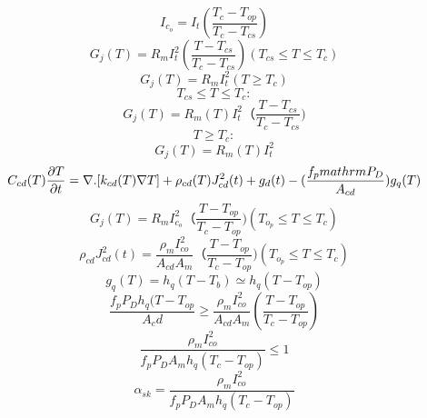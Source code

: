 \begin{equation}%
I_{c_o}=I_t(\frac{T_c-T_{op} }{T_c-T_{cs}})
\end{equation}
\begin{equation}%
G_j(T)=R_mI_t^2(\frac{T-T_{cs}}{T_c-T_{cs}}) (T_{cs}\leq T\leq T_c)
\end{equation}
\begin{equation}%
G_j(T)=R_mI_t^2 (T\ge T_c)
\end{equation}
\begin{equation}%
T_{cs}\leq T\leq T_c:
\end{equation}
\begin{equation}%
G_j(T)=R_m(T)I_t^2（\frac{T-T_{cs}}{T_c-T_{cs}})
\end{equation}
\begin{equation}%
T\ge T_c:
\end{equation}
\begin{equation}%
G_j(T)=R_m(T)I_t^2
\end{equation}
\begin{equation}%
C_{cd}(T)\frac {\partial T}{\partial t}=\nabla.[k_{cd}(T)\nabla T]+\rho _{cd}(T)J_{cd}^2(t)+g_d(t)-(\frac{f_p\ \\mathrm{P}_D}{A_{cd}})g_q(T)
\end{equation}
\begin{equation}%
G_j(T)=R_mI_{c_o}^2（\frac{T-T_{op}}{T_c-T_{op}}) (T_{o_p}\leq T \leq T_c)
\end{equation}
\begin{equation}%
\rho_{cd}J^2_{cd}(t)=\frac{\rho_{m}I_{co}^2}{A_{cd}A_m}
（\frac{T-T_{op}}{T_c-T_{op}}) (T_{o_p}\leq T \leq T_c)
\end{equation}
\begin{equation}%
g_q(T)=h_q(T-T_b)\simeq h_q(T-T_{op})
\end{equation}
\begin{equation}%
\frac{f_pP_Dh_q(T-T_{op}}{A_cd}\geq \frac{\rho_m I_{co}^2}{A_{cd}A_m}(\frac{T-T_{op}}{T_c-T_{op}})
\end{equation}
\begin{equation}%
\frac{\rho_m I_{co}^2}{f_pP_DA_mh_q(T_c-T_{op})}\leq 1
\end{equation}
\begin{equation}%
\alpha_{sk}=\frac{\rho_m I_{co}^2}{f_pP_DA_mh_q(T_c-T_{op})}
\end{equation}
